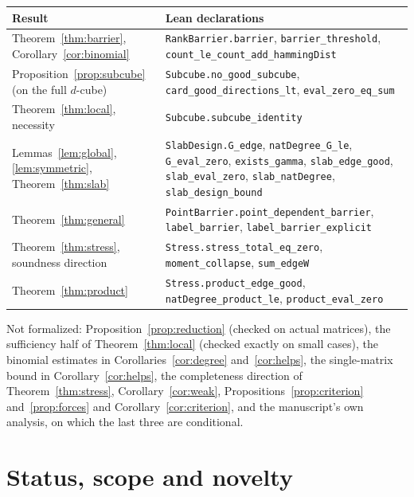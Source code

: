 \documentclass[11pt]{article}
\theoremstyle{definition}
\theoremstyle{remark}
\begin{document}
\begin{center}\small
\begin{tabular}{>{\raggedright}p{}>{\raggedright\arraybackslash}p{}}
\toprule
Result & Lean declarations\\
\midrule
Theorem~\ref{thm:barrier}, Corollary~\ref{cor:binomial} & \texttt{RankBarrier.barrier}, \texttt{barrier\_threshold}, \texttt{count\_le\_count\_add\_hammingDist}\\
Proposition~\ref{prop:subcube} (on the full $d$-cube) & \texttt{Subcube.no\_good\_subcube}, \texttt{card\_good\_directions\_lt}, \texttt{eval\_zero\_eq\_sum}\\
Theorem~\ref{thm:local}, necessity & \texttt{Subcube.subcube\_identity}\\
Lemmas~\ref{lem:global}, \ref{lem:symmetric}, Theorem~\ref{thm:slab} & \texttt{SlabDesign.G\_edge}, \texttt{natDegree\_G\_le}, \texttt{G\_eval\_zero}, \texttt{exists\_gamma}, \texttt{slab\_edge\_good}, \texttt{slab\_eval\_zero}, \texttt{slab\_natDegree}, \texttt{slab\_design\_bound}\\
Theorem~\ref{thm:general} & \texttt{PointBarrier.point\_dependent\_barrier}, \texttt{label\_barrier}, \texttt{label\_barrier\_explicit}\\
Theorem~\ref{thm:stress}, soundness direction & \texttt{Stress.stress\_total\_eq\_zero}, \texttt{moment\_collapse}, \texttt{sum\_edgeW}\\
Theorem~\ref{thm:product} & \texttt{Stress.product\_edge\_good}, \texttt{natDegree\_product\_le}, \texttt{product\_eval\_zero}\\
\bottomrule
\end{tabular}
\end{center}

Not formalized: Proposition~\ref{prop:reduction} (checked on actual matrices), the sufficiency half of Theorem~\ref{thm:local} (checked exactly on small cases), the binomial estimates in Corollaries~\ref{cor:degree} and~\ref{cor:helps}, the single-matrix bound in Corollary~\ref{cor:helps}, the completeness direction of Theorem~\ref{thm:stress}, Corollary~\ref{cor:weak}, Propositions~\ref{prop:criterion} and~\ref{prop:forces} and Corollary~\ref{cor:criterion}, and the manuscript's own analysis, on which the last three are conditional.

\section{Status, scope and novelty}\label{sec:status}
\end{document}

